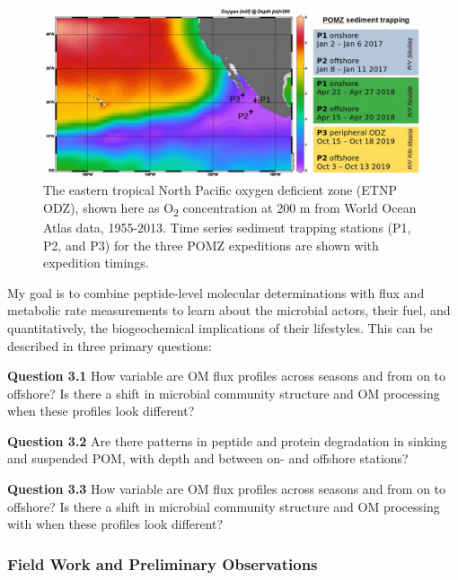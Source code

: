 \documentclass[12pt, letterpaper, twoside]{article}
\begin{document}
\bigskip

\begin{figure}
	\includegraphics[width=\linewidth]{pomz-sed-trap-sta.jpg}
	\caption{The eastern tropical North Pacific oxygen deficient zone (ETNP ODZ), shown here as O\textsubscript{2} concentration at 200 m from World Ocean Atlas data, 1955-2013. Time series sediment trapping stations (P1, P2, and P3) for the three POMZ expeditions are shown with expedition timings.}
	\label{fig:etnp map}
\end{figure}

My goal is to combine peptide-level molecular determinations with flux and metabolic rate measurements to learn about the microbial actors, their fuel, and quantitatively, the biogeochemical implications of their lifestyles. This can be described in three primary questions:

\bigskip

\textbf{Question 3.1} How variable are OM flux profiles across seasons and from on to offshore? Is there a shift in microbial community structure and OM processing when these profiles look different?

\bigskip

\textbf{Question 3.2} Are there patterns in peptide and protein degradation in sinking and suspended POM, with depth and between on- and offshore stations?

\bigskip

\textbf{Question 3.3} How variable are OM flux profiles across seasons and from on to offshore? Is there a shift in microbial community structure and OM processing with  when these profiles look different?



\subsubsection{Field Work and Preliminary Observations}
\end{document}
